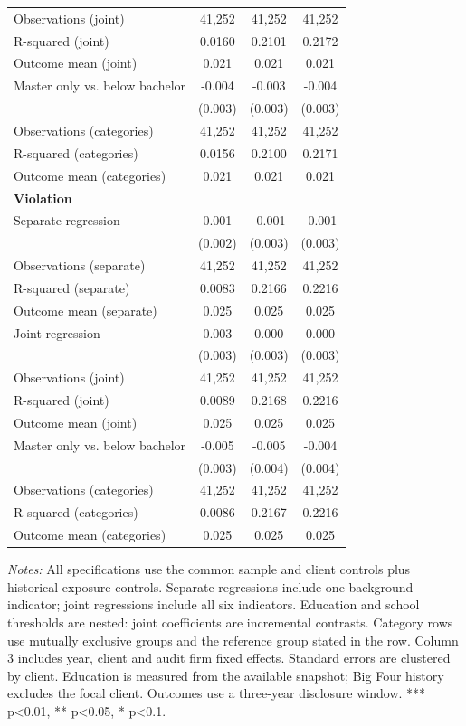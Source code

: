 \documentclass[10pt]{article}
\begin{document}
\begin{minipage}{19cm}
\begin{threeparttable}
\begin{tabular}{p{}ccc}
Observations (joint) & 41,252 & 41,252 & 41,252 \\
R-squared (joint) & 0.0160 & 0.2101 & 0.2172 \\
Outcome mean (joint) & 0.021 & 0.021 & 0.021 \\
Master only vs. below bachelor & -0.004 & -0.003 & -0.004 \\
 & (0.003) & (0.003) & (0.003) \\
Observations (categories) & 41,252 & 41,252 & 41,252 \\
R-squared (categories) & 0.0156 & 0.2100 & 0.2171 \\
Outcome mean (categories) & 0.021 & 0.021 & 0.021 \\
\multicolumn{4}{l}{\textbf{Violation}} \\
Separate regression & 0.001 & -0.001 & -0.001 \\
 & (0.002) & (0.003) & (0.003) \\
Observations (separate) & 41,252 & 41,252 & 41,252 \\
R-squared (separate) & 0.0083 & 0.2166 & 0.2216 \\
Outcome mean (separate) & 0.025 & 0.025 & 0.025 \\
Joint regression & 0.003 & 0.000 & 0.000 \\
 & (0.003) & (0.003) & (0.003) \\
Observations (joint) & 41,252 & 41,252 & 41,252 \\
R-squared (joint) & 0.0089 & 0.2168 & 0.2216 \\
Outcome mean (joint) & 0.025 & 0.025 & 0.025 \\
Master only vs. below bachelor & -0.005 & -0.005 & -0.004 \\
 & (0.003) & (0.004) & (0.004) \\
Observations (categories) & 41,252 & 41,252 & 41,252 \\
R-squared (categories) & 0.0086 & 0.2167 & 0.2216 \\
Outcome mean (categories) & 0.025 & 0.025 & 0.025 \\
\bottomrule
\end{tabular}
\begin{tablenotes}\fontsize{9}{11}\selectfont
\item \raggedright \fontsize{9}{11}\selectfont \textit{Notes:} All specifications use the common sample and client controls plus historical exposure controls. Separate regressions include one background indicator; joint regressions include all six indicators. Education and school thresholds are nested: joint coefficients are incremental contrasts. Category rows use mutually exclusive groups and the reference group stated in the row. Column 3 includes year, client and audit firm fixed effects. Standard errors are clustered by client. Education is measured from the available snapshot; Big Four history excludes the focal client. Outcomes use a three-year disclosure window. *** p<0.01, ** p<0.05, * p<0.1.
\end{tablenotes}
\end{threeparttable}

\end{minipage}
\end{document}
